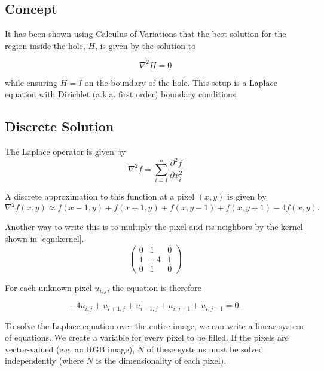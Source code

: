 \documentclass{InsightArticle}
\begin{document}
\subsection{Concept}
It has been shown using Calculus of Variations that the best solution for the region inside the hole, $H$, is given by the solution to 

\begin{equation}
\nabla^2 H = 0
\end{equation}

while ensuring $H=I$ on the boundary of the hole. This setup is a Laplace equation with Dirichlet (a.k.a. first order) boundary conditions. 

\subsection{Discrete Solution}
The Laplace operator is given by
\begin{equation}
 \nabla^2 f = \sum_{i=1}^n \frac{\partial^2 f}{\partial x_i^2}
\end{equation}

A discrete approximation to this function at a pixel $(x,y)$ is given by
\begin{equation}
 \nabla^2 f(x,y) \approx f(x-1,y) + f(x+1,y) + f(x,y-1) + f(x,y+1) - 4f(x,y).
\end{equation}

Another way to write this is to multiply the pixel and its neighbors by the kernel shown in \ref{eqn:kernel}.
\begin{equation}
\label{eqn:kernel}
\begin{pmatrix}
0 & 1 & 0 \\
1 & -4 & 1\\
0 & 1 & 0
\end{pmatrix}
\end{equation}


For each unknown pixel $u_{i,j}$, the equation is therefore

\begin{equation}
\label{eqn:DiscreteLaplacian}
-4 u_{i,j} + u_{i+1,j} + u_{i-1,j} + u_{i,j+1} + u_{i,j-1} = 0.
\end{equation}

To solve the Laplace equation over the entire image, we can write a linear system of equations. We create a variable for every pixel to be filled. If the pixels are vector-valued (e.g. an RGB image), $N$ of these systems must be solved independently (where $N$ is the dimensionality of each pixel).
\end{document}
